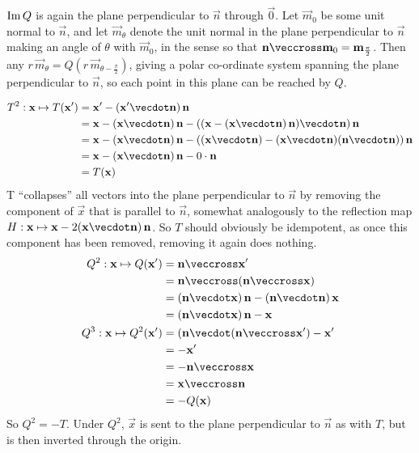 \documentclass[fleqn,a4paper,11pt]{article}
\begin{document}
\begin{enumerate}[label=\textbf{\arabic*.}]
\begin{enumerate}[label=(\alph*)]
      \(\operatorname{Im} Q\) is again the plane perpendicular to \(\vec n\) through
      \(\vec 0\). Let \(\vec m_0\) be some unit normal to \(\vec n\), and let
      \(\vec m_\theta\) denote the unit normal in the plane perpendicular to
      \(\vec n\) making an angle of \(\theta\) with \(\vec m_0\), in the sense
      so that \(\vec n \veccross \vec m_0 = \vec m_{\frac \pi 2}\). Then any
      \(r\,\vec m_\theta = Q(r\,\vec m_{\theta - \frac \pi 2})\), giving a polar
      co-ordinate system spanning the plane perpendicular to \(\vec n\), so each
      point in this plane can be reached by \(Q\).
    \end{enumerate}
    \begin{align*}
     T^2 : \vec x \mapsto T(\vec x')
      &= \vec x' - (\vec x' \vecdot \vec n)\,\vec n \\
      &= \vec x - (\vec x \vecdot \vec n)\, \vec n -
         ((\vec x - (\vec x \vecdot \vec n)\, \vec n) \vecdot \vec n)\,\vec n \\
      &= \vec x - (\vec x \vecdot \vec n)\, \vec n -
         ((\vec x \vecdot \vec n) -
          (\vec x \vecdot \vec n)(\vec n \vecdot \vec n))\,\vec n \\
      &= \vec x - (\vec x \vecdot \vec n)\, \vec n -
         0 \cdot \vec n \\
      &= T(\vec x)
    \end{align*}
    T ``collapses'' all vectors into the plane perpendicular to \(\vec n\) by
    removing the component of \(\vec x\) that is parallel to \(\vec n\),
    somewhat analogously to the reflection map
    \(H: \vec x \mapsto \vec x - 2 (\vec x \vecdot \vec n)\,\vec n\). So \(T\)
    should obviously be idempotent, as once this component has been removed,
    removing it again does nothing.
    \begin{align*}
     Q^2: \vec x \mapsto Q(\vec x')
      &= \vec n \veccross \vec x' \\
      &= \vec n \veccross (\vec n \veccross \vec x) \\
      &= (\vec n \vecdot \vec x)\,\vec n - (\vec n \vecdot \vec n)\,\vec x \\
      &= (\vec n \vecdot \vec x)\,\vec n - \vec x \\
     Q^3: \vec x \mapsto Q^2(\vec x')
      &= (\vec n \vecdot (\vec n \veccross \vec x') - \vec x' \\
      &= -\vec x' \\
      &= - \vec n \veccross \vec x \\
      &= \vec x \veccross \vec n \\
      &= -Q(\vec x)
    \end{align*}
    So \(Q^2 = -T\). Under \(Q^2\), \(\vec x\) is sent to the plane perpendicular
    to \(\vec n\) as with \(T\), but is then inverted through the origin.


\end{enumerate}
\end{document}
